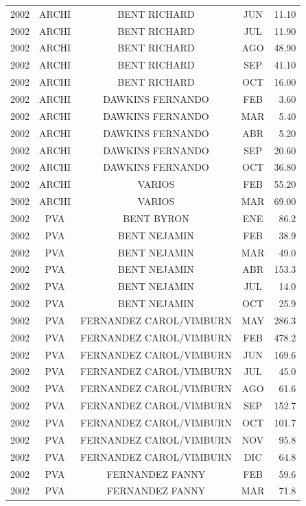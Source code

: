 \documentclass[12pt,]{article}
\begin{document}
\begin{table}[ht]
{\begin{tabular}{lcccr}
  2002 & ARCHI & BENT RICHARD & JUN & 11.10 \\ 
  2002 & ARCHI & BENT RICHARD & JUL & 11.90 \\ 
  2002 & ARCHI & BENT RICHARD & AGO & 48.90 \\ 
  2002 & ARCHI & BENT RICHARD & SEP & 41.10 \\ 
  2002 & ARCHI & BENT RICHARD & OCT & 16.00 \\ 
  2002 & ARCHI & DAWKINS FERNANDO & FEB & 3.60 \\ 
  2002 & ARCHI & DAWKINS FERNANDO & MAR & 5.40 \\ 
  2002 & ARCHI & DAWKINS FERNANDO & ABR & 5.20 \\ 
  2002 & ARCHI & DAWKINS FERNANDO & SEP & 20.60 \\ 
  2002 & ARCHI & DAWKINS FERNANDO & OCT & 36.80 \\ 
  2002 & ARCHI & VARIOS & FEB & 55.20 \\ 
  2002 & ARCHI & VARIOS & MAR & 69.00 \\ 
  2002 & PVA & BENT BYRON & ENE & 86.2 \\ 
  2002 & PVA & BENT NEJAMIN & FEB & 38.9 \\ 
  2002 & PVA & BENT NEJAMIN & MAR & 49.0 \\ 
  2002 & PVA & BENT NEJAMIN & ABR & 153.3 \\ 
  2002 & PVA & BENT NEJAMIN & JUL & 14.0 \\ 
  2002 & PVA & BENT NEJAMIN & OCT & 25.9 \\ 
  2002 & PVA & FERNANDEZ CAROL/VIMBURN & MAY & 286.3 \\ 
  2002 & PVA & FERNANDEZ CAROL/VIMBURN & FEB & 478.2 \\ 
  2002 & PVA & FERNANDEZ CAROL/VIMBURN & JUN & 169.6 \\ 
  2002 & PVA & FERNANDEZ CAROL/VIMBURN & JUL & 45.0 \\ 
  2002 & PVA & FERNANDEZ CAROL/VIMBURN & AGO & 61.6 \\ 
  2002 & PVA & FERNANDEZ CAROL/VIMBURN & SEP & 152.7 \\ 
  2002 & PVA & FERNANDEZ CAROL/VIMBURN & OCT & 101.7 \\ 
  2002 & PVA & FERNANDEZ CAROL/VIMBURN & NOV & 95.8 \\ 
  2002 & PVA & FERNANDEZ CAROL/VIMBURN & DIC & 64.8 \\ 
  2002 & PVA & FERNANDEZ FANNY & FEB & 59.6 \\ 
  2002 & PVA & FERNANDEZ FANNY & MAR & 71.8 \\ 

\end{tabular}}
\end{table}
\end{document}
